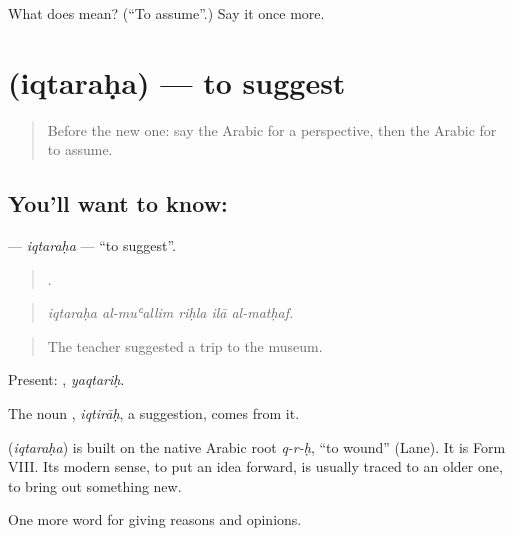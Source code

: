 \begin{tcolorbox}[breakable,colback=teal!4,colframe=teal!35!black,title={Before you move on}]
What does  mean? (\textquotedblleft{}To assume\textquotedblright{}.) Say it once more.
\end{tcolorbox}
\section[\texorpdfstring{\ar{اقترح} (iqtaraḥa)}{اقترح (iqtaraḥa)}]{ (iqtaraḥa) — to suggest}

\label{lesson:AR-C359-iqtaraha}



\begin{quote}
Before the new one: say the Arabic for a perspective, then the Arabic for to assume.
\end{quote}

\subsection*{You'll want to know: }
\textbf{} — \emph{iqtaraḥa} — \textquotedblleft{}to suggest\textquotedblright{}.

\begin{quote}
    .
\end{quote}

\begin{quote}
\emph{iqtaraḥa al-muʿallim riḥla ilā al-matḥaf.}
\end{quote}

\begin{quote}
The teacher suggested a trip to the museum.
\end{quote}

Present: , \emph{yaqtariḥ}.

The noun , \emph{iqtirāḥ}, a suggestion, comes from it.

\begin{cousinweb}
\textbf{} (\emph{iqtaraḥa}) is built on the native Arabic root \emph{q-r-ḥ}, \textquotedblleft{}to wound\textquotedblright{} (Lane). It is Form VIII. Its modern sense, to put an idea forward, is usually traced to an older one, to bring out something new.
\end{cousinweb}

\begin{grammarlens}[title={What you've built}]
One more word for giving reasons and opinions.
\end{grammarlens}

